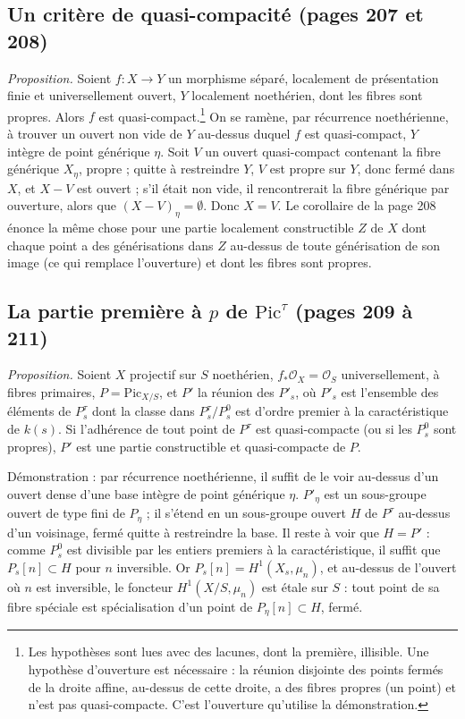 \documentclass[11pt,a4paper]{article}
\begin{document}
\subsection*{Un critère de quasi-compacité (pages 207 et 208)}

\emph{Proposition.} Soient $f \colon X \to Y$ un morphisme séparé, localement
de présentation finie et universellement ouvert, $Y$ localement noethérien,
dont les fibres sont propres. Alors $f$ est quasi-compact.\footnote{Les
hypothèses sont lues avec des lacunes, dont la première, illisible. Une
hypothèse d'ouverture est nécessaire : la réunion disjointe des points fermés
de la droite affine, au-dessus de cette droite, a des fibres propres (un point)
et n'est pas quasi-compacte. C'est l'ouverture qu'utilise la démonstration.} On
se ramène, par récurrence noethérienne, à trouver un ouvert non vide de $Y$
au-dessus duquel $f$ est quasi-compact, $Y$ intègre de point générique $\eta$.
Soit $V$ un ouvert quasi-compact contenant la fibre générique $X_\eta$, propre ;
quitte à restreindre $Y$, $V$ est propre sur $Y$, donc fermé dans $X$, et
$X - V$ est ouvert ; s'il était non vide, il rencontrerait la fibre générique
par ouverture, alors que $(X - V)_\eta = \emptyset$. Donc $X = V$. Le corollaire
de la page 208 énonce la même chose pour une partie localement constructible
$Z$ de $X$ dont chaque point a des générisations dans $Z$ au-dessus de toute
générisation de son image (ce qui remplace l'ouverture) et dont les fibres
sont propres.

\subsection*{La partie première à $p$ de $\mathrm{Pic}^\tau$ (pages 209 à 211)}

\emph{Proposition.} Soient $X$ projectif sur $S$ noethérien,
$f_*\mathcal{O}_X = \mathcal{O}_S$ universellement, à fibres primaires,
$P = \mathrm{Pic}_{X/S}$, et $P'$ la réunion des $P'_s$, où $P'_s$ est
l'ensemble des éléments de $P^\tau_s$ dont la classe dans $P^\tau_s/P^0_s$ est
d'ordre premier à la caractéristique de $k(s)$. Si l'adhérence de tout point
de $P^\tau$ est quasi-compacte (ou si les $P^0_s$ sont propres), $P'$ est une
partie constructible et quasi-compacte de $P$.

Démonstration : par récurrence noethérienne, il suffit de le voir au-dessus
d'un ouvert dense d'une base intègre de point générique $\eta$. $P'_\eta$ est un
sous-groupe ouvert de type fini de $P_\eta$ ; il s'étend en un sous-groupe
ouvert $H$ de $P^\tau$ au-dessus d'un voisinage, fermé quitte à restreindre la
base. Il reste à voir que $H = P'$ : comme $P^0_s$ est divisible par les
entiers premiers à la caractéristique, il suffit que $P_s[n] \subset H$ pour
$n$ inversible. Or $P_s[n] = H^1(X_s, \mu_n)$, et au-dessus de l'ouvert où $n$
est inversible, le foncteur $H^1(X/S, \mu_n)$ est étale sur $S$ : tout point de
sa fibre spéciale est spécialisation d'un point de $P_\eta[n] \subset H$, fermé.
\end{document}
